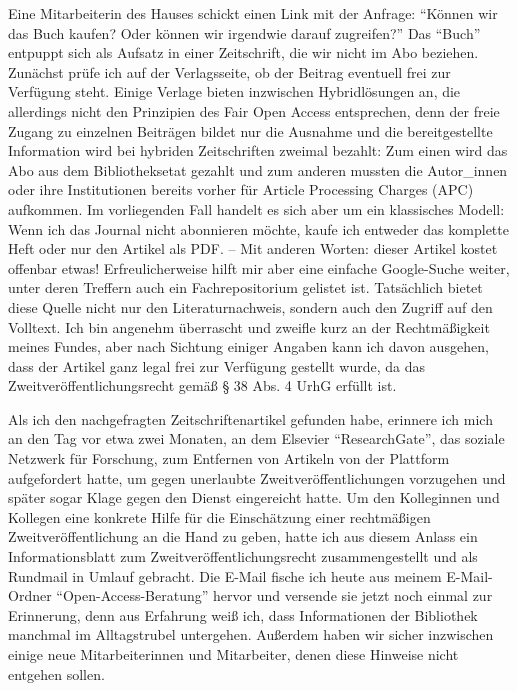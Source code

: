 \documentclass[a4paper,
fontsize=11pt,
oneside,
numbers=noperiodatend,
parskip=half-,
bibliography=totoc,
final
]{scrartcl}
\begin{document}
Eine Mitarbeiterin des Hauses schickt einen Link mit der Anfrage:
\enquote{Können wir das Buch kaufen? Oder können wir irgendwie darauf
zugreifen?} Das \enquote{Buch} entpuppt sich als Aufsatz in einer
Zeitschrift, die wir nicht im Abo beziehen. Zunächst prüfe ich auf der
Verlagsseite, ob der Beitrag eventuell frei zur Verfügung steht. Einige
Verlage bieten inzwischen Hybridlösungen an, die allerdings nicht den
Prinzipien des Fair Open Access entsprechen, denn der freie Zugang zu
einzelnen Beiträgen bildet nur die Ausnahme und die bereitgestellte
Information wird bei hybriden Zeitschriften zweimal bezahlt: Zum einen
wird das Abo aus dem Bibliotheksetat gezahlt und zum anderen mussten die
Autor\_innen oder ihre Institutionen bereits vorher für Article
Processing Charges (APC) aufkommen. Im vorliegenden Fall handelt es sich
aber um ein klassisches Modell: Wenn ich das Journal nicht abonnieren
möchte, kaufe ich entweder das komplette Heft oder nur den Artikel als
PDF. -- Mit anderen Worten: dieser Artikel kostet offenbar etwas!
Erfreulicherweise hilft mir aber eine einfache Google-Suche weiter,
unter deren Treffern auch ein Fachrepositorium gelistet ist. Tatsächlich
bietet diese Quelle nicht nur den Literaturnachweis, sondern auch den
Zugriff auf den Volltext. Ich bin angenehm überrascht und zweifle kurz
an der Rechtmäßigkeit meines Fundes, aber nach Sichtung einiger Angaben
kann ich davon ausgehen, dass der Artikel ganz legal frei zur Verfügung
gestellt wurde, da das Zweitveröffentlichungsrecht gemäß § 38 Abs. 4
UrhG erfüllt ist.

Als ich den nachgefragten Zeitschriftenartikel gefunden habe, erinnere
ich mich an den Tag vor etwa zwei Monaten, an dem Elsevier
\enquote{ResearchGate}, das soziale Netzwerk für Forschung, zum
Entfernen von Artikeln von der Plattform aufgefordert hatte, um gegen
unerlaubte Zweitveröffentlichungen vorzugehen und später sogar Klage
gegen den Dienst eingereicht hatte. Um den Kolleginnen und Kollegen eine
konkrete Hilfe für die Einschätzung einer rechtmäßigen
Zweitveröffentlichung an die Hand zu geben, hatte ich aus diesem Anlass
ein Informationsblatt zum Zweitveröffentlichungsrecht zusammengestellt
und als Rundmail in Umlauf gebracht. Die E-Mail fische ich heute aus
meinem E-Mail-Ordner \enquote{Open-Access-Beratung} hervor und versende
sie jetzt noch einmal zur Erinnerung, denn aus Erfahrung weiß ich, dass
Informationen der Bibliothek manchmal im Alltagstrubel untergehen.
Außerdem haben wir sicher inzwischen einige neue Mitarbeiterinnen und
Mitarbeiter, denen diese Hinweise nicht entgehen sollen.
\end{document}
